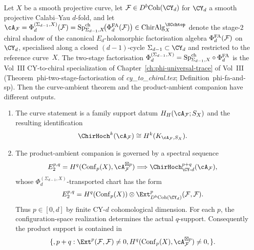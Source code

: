 \begin{theorem}
\label{thm:chirhoch-above-degree-d-vanishes}
\ClaimStatusConditional
Let $X$ be a smooth projective curve, let $\mathcal F\in
D^b\mathrm{Coh}(\CY_d)$ for $\CY_d$ a smooth projective
Calabi--Yau $d$-fold, and let
$\cA_\mathcal F=\Phi_d^{(\Sigma_{d-1},X)}(\mathcal F)
= \SpCh_{\Sigma_{d-1}, X}\!\bigl(\PhiFA_d(\mathcal F)\bigr)
\in\mathrm{ChirAlg}_X^{\SCchtop}$
denote the stage-$2$ chiral shadow of the canonical $E_d$-holomorphic
factorisation algebra $\Phi^{\mathrm{FA}}_d(\mathcal F)$ on $\CY_d$, specialised
along a closed $(d-1)$-cycle $\Sigma_{d-1} \subset \CY_d$ and
restricted to the reference curve~$X$. The two-stage factorisation
$\Phi_d^{(\Sigma_{d-1},X)}
= \mathrm{Sp}^{\mathrm{ch}}_{\Sigma_{d-1}, X} \circ \Phi^{\mathrm{FA}}_d$ is the Vol~III
CY-to-chiral specialization of
Chapter~\textup{\ref{ch:phi-universal-trace}} of Vol~III
(Theorem~\textup{phi-two-stage-factorisation} of
\textit{cy\_to\_chiral.tex}; Definition~\textup{phi-fa-and-sp}). Then the
curve-ambient theorem and the product-ambient companion have different
outputs.

\begin{enumerate}[label=\textup{(\roman*)}]
\item The curve statement is a family support datum
$H_H(\cA_\mathcal F;S_X)$ and the resulting identification
\[
 \ChirHoch^k(\cA_\mathcal F)
 \cong H^k(K_{\cA_\mathcal F,S_X}).
\]

\item The product-ambient companion is governed by a spectral sequence
\[
 E_2^{p,q}
 =H^q(\mathrm{Conf}_p(X),\cA_\mathcal F^{\boxtimes p})
 \Longrightarrow
 \ChirHoch^{p+q}_{\CY\text{-}d}(\cA_\mathcal F),
\]
whose $\Phi_d^{(\Sigma_{d-1},X)}$-transported chart has the form
\[
 E_2^{p,q}
 =H^q(\mathrm{Conf}_p(X))\otimes
 \Ext^p_{D^b\mathrm{Coh}(\CY_d)}(\mathcal F,\mathcal F).
\]
Thus $p\in[0,d]$ by finite CY-$d$ cohomological dimension.  For each
$p$, the configuration-space realization determines the actual
$q$-support.  Consequently the product support is contained in
\[
 \{,p+q:\Ext^p(\mathcal F,\mathcal F)\neq0,
 H^q(\mathrm{Conf}_p(X),\cA_\mathcal F^{\boxtimes p})\neq0,\}.
\]


\end{enumerate}
\end{theorem}
